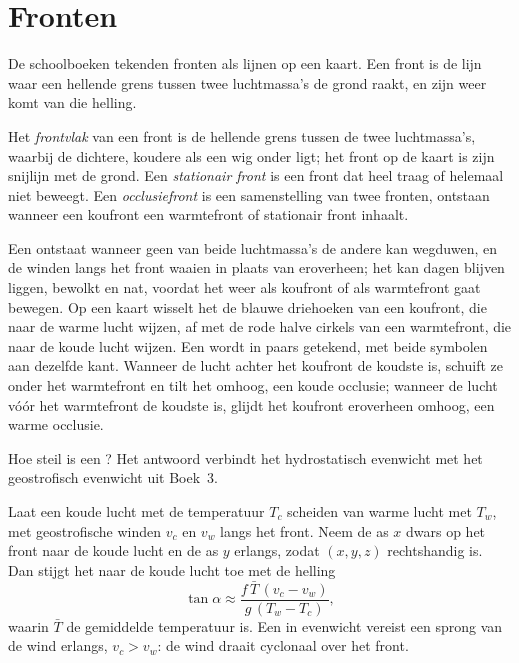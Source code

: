 \section{Fronten}\label{sec:b2:weather-systems:fronts}

De schoolboeken tekenden fronten als lijnen op een kaart. Een front is de lijn waar een hellende grens
tussen twee luchtmassa's de grond raakt, en zijn weer komt van die helling.

\begin{definition}\label{def:b2:weather-systems:fronts}
Het \emph{frontvlak} van een front is de hellende grens tussen
de twee luchtmassa's, waarbij de dichtere, koudere als een wig onder ligt; het front op de kaart is zijn
snijlijn met de grond. Een \emph{stationair front} is een front
dat heel traag of helemaal niet beweegt. Een \emph{occlusiefront} is een
samenstelling van twee fronten, ontstaan wanneer een koufront een warmtefront of stationair front inhaalt.
\end{definition}

Een  ontstaat wanneer geen van beide luchtmassa's de andere kan wegduwen, en de winden langs het
front waaien in plaats van eroverheen; het kan dagen blijven liggen, bewolkt en nat, voordat het weer als koufront
of als warmtefront gaat bewegen. Op een kaart wisselt het de blauwe driehoeken van een koufront, die naar de
warme lucht wijzen, af met de rode halve cirkels van een warmtefront, die naar de koude lucht wijzen. Een
 wordt in paars getekend, met beide symbolen aan dezelfde kant. Wanneer de lucht achter het koufront
de koudste is, schuift ze onder het warmtefront en tilt het omhoog, een koude occlusie; wanneer de lucht
vóór het warmtefront de koudste is, glijdt het koufront eroverheen omhoog, een warme occlusie.

Hoe steil is een ? Het antwoord verbindt het hydrostatisch evenwicht met het geostrofisch
evenwicht uit Boek~3.

\begin{proposition}\label{prop:b2:weather-systems:slope}
Laat een  koude lucht met de temperatuur $T_c$ scheiden van warme lucht met $T_w$, met
geostrofische winden $v_c$ en $v_w$ langs het front. Neem de as $x$ dwars op het front naar de
koude lucht en de as $y$ erlangs, zodat $(x, y, z)$ rechtshandig is. Dan stijgt het
 naar de koude lucht toe met de helling
\[
  \tan\alpha \approx \frac{f\,\bar T\,(v_c - v_w)}{g\,(T_w - T_c)},
\]
waarin $\bar T$ de gemiddelde temperatuur is. Een  in evenwicht vereist een sprong van de wind
erlangs, $v_c > v_w$: de wind draait cyclonaal over het front.
\end{proposition}

